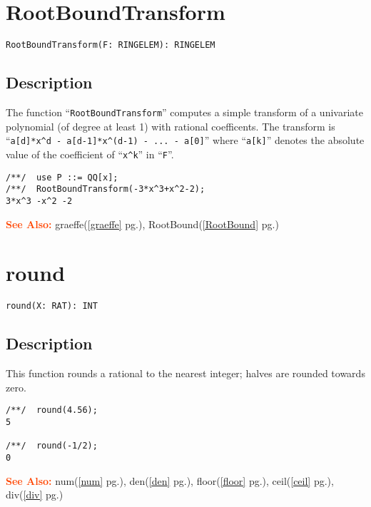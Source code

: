 \documentclass[a4paper]{mybook}
\newenvironment{command}{}{} %
\newcommand\SeeAlso{\par\textcolor{OrangeRed}{\textbf{\large See Also: }}}
\begin{document}
\section{RootBoundTransform}
\label{RootBoundTransform}
\begin{command} %


\begin{Verbatim}[label=syntax, rulecolor=\color{MidnightBlue},
frame=single]
RootBoundTransform(F: RINGELEM): RINGELEM
\end{Verbatim}


\subsection*{Description}

The function ``\verb&RootBoundTransform&'' computes a simple transform of a
univariate polynomial (of degree at least 1) with rational coefficents.
The transform is ``\verb&a[d]*x^d - a[d-1]*x^(d-1) - ... - a[0]&'' where
``\verb&a[k]&'' denotes the absolute value of the coefficient of ``\verb&x^k&'' in ``\verb&F&''.
\begin{Verbatim}[label=example, rulecolor=\color{PineGreen}, frame=single]
/**/  use P ::= QQ[x];
/**/  RootBoundTransform(-3*x^3+x^2-2);
3*x^3 -x^2 -2
\end{Verbatim}


\SeeAlso %
  graeffe(\ref{graeffe} pg.\pageref{graeffe}), 
    RootBound(\ref{RootBound} pg.\pageref{RootBound})
\end{command} %

\section{round}
\label{round}
\begin{command} %


\begin{Verbatim}[label=syntax, rulecolor=\color{MidnightBlue},
frame=single]
round(X: RAT): INT
\end{Verbatim}


\subsection*{Description}

This function rounds a rational to the nearest integer; halves are
rounded towards zero.
\begin{Verbatim}[label=example, rulecolor=\color{PineGreen}, frame=single]
/**/  round(4.56);
5

/**/  round(-1/2);
0
\end{Verbatim}


\SeeAlso %
  num(\ref{num} pg.\pageref{num}), 
    den(\ref{den} pg.\pageref{den}), 
    floor(\ref{floor} pg.\pageref{floor}), 
    ceil(\ref{ceil} pg.\pageref{ceil}), 
    div(\ref{div} pg.\pageref{div})
\end{command} %
\end{document}
